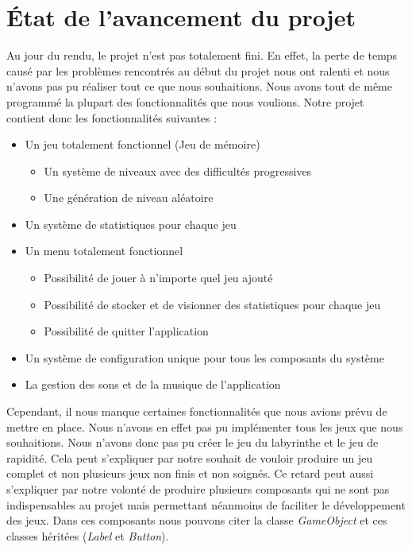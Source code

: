 \documentclass{polytech/polytech}
\begin{document}
\section{État de l'avancement du projet}
Au jour du rendu, le projet n'est pas totalement fini. En effet, la perte de temps causé par les problèmes rencontrés au  début du projet nous ont ralenti et nous n'avons pas pu réaliser tout ce que nous souhaitions. Nous avons tout de même programmé la plupart des fonctionnalités que nous voulions. Notre projet contient donc les fonctionnalités suivantes :
\begin{itemize}
\item Un jeu totalement fonctionnel (Jeu de mémoire)
\begin{itemize}
\item Un système de niveaux avec des difficultés progressives
\item Une génération de niveau aléatoire
\end{itemize}
\item Un système de statistiques pour chaque jeu
\item Un menu totalement fonctionnel
\begin{itemize}
\item Possibilité de jouer à n'importe quel jeu ajouté
\item Possibilité de stocker et de visionner des statistiques pour chaque jeu
\item Possibilité de quitter l'application
\end{itemize}
\item Un système de configuration unique pour tous les composants du système
\item La gestion des sons et de la musique de l'application
\end{itemize}

Cependant, il nous manque certaines fonctionnalités que nous avions prévu de mettre en place. Nous n'avons en effet pas pu implémenter tous les jeux que nous souhaitions. Nous n'avons donc pas pu créer le jeu du labyrinthe et le jeu de rapidité. Cela peut s'expliquer par notre souhait de vouloir produire un jeu complet et non plusieurs jeux non finis et non soignés. Ce retard peut aussi s'expliquer par notre volonté de produire plusieurs composants qui ne sont pas indispensables au projet mais permettant néanmoins de faciliter le développement des jeux. Dans ces composants nous pouvons citer la classe \textit{GameObject} et ces classes héritées (\textit{Label} et \textit{Button}). 
\end{document}
